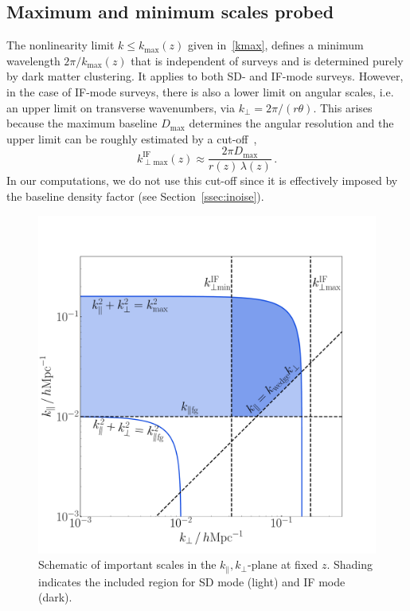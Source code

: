 \subsection{Maximum and minimum scales probed}
%
The nonlinearity limit $k\leq k_\mathrm{max}(z)$ given in~\eqref{kmax}, defines a minimum wavelength $2\pi/ k_\mathrm{max}(z)$ that is independent of surveys and is determined purely by dark matter clustering. It applies to both SD- and IF-mode surveys.
However, in the case of IF-mode surveys, there is also a lower limit on angular scales, i.e. an upper limit on transverse wavenumbers, via $k_\perp=2\pi/(r\theta)$. This arises because the maximum baseline $D_\mathrm{max}$ determines the  angular resolution  and the upper limit can be roughly estimated by a cut-off~\cite{Bull:2014rha,Alonso:2017dgh,Karagiannis:2019jjx,Durrer:2020orn},
\begin{equation} \label{kifmax}
k_{\perp \mathrm{max}}^\mathrm{IF}(z) \approx \frac{2\pi D_\mathrm{max}}{r(z)\,\lambda(z)}\,.
\end{equation}
In our computations, we do not use this cut-off since it is effectively imposed by the baseline density factor (see Section~\ref{ssec:inoise}).
\begin{figure}[!ht]
\centering
\includegraphics[width=.8\textwidth]{fig/kplane}
\caption{Schematic of important scales in the $k_\|,k_\perp$-plane at fixed $z$. Shading indicates the included region for SD mode (light) and IF mode (dark).}\label{kplane}
\end{figure}


